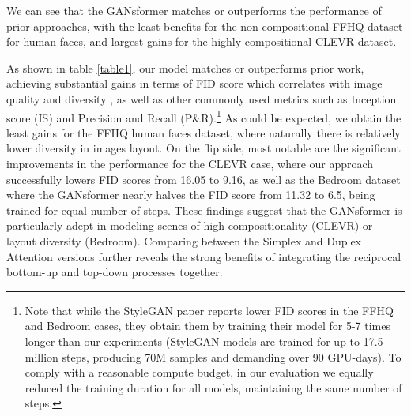\documentclass{article}
\begin{document}
\begin{figure*}[t]
\centering
{}
\hfill
{}
\hfill
{}
\vspace*{-2mm}
\caption{From left to right: \textbf{(1-2)} Performance as a function of start and final layers the attention is applied to. \textbf{(3)}: data-efficiency experiments for CLEVR.}
\label{plots}
\vspace*{-12pt}
\end{figure*}

We can see that the GANsformer matches or outperforms the performance of prior approaches, with the least benefits for the non-compositional FFHQ dataset for human faces, and largest gains for the highly-compositional CLEVR dataset. 

As shown in table \ref{table1}, our model matches or outperforms prior work, achieving substantial gains in terms of FID score which correlates with image quality and diversity \citep{fid}, as well as other commonly used metrics such as Inception score (IS) and Precision and Recall (P{\&}R).\footnote{Note that while the StyleGAN paper \citep{stylegan2} reports lower FID scores in the FFHQ and Bedroom cases, they obtain them by training their model for 5-7 times longer than our experiments (StyleGAN models are trained for up to 17.5 million steps, producing 70M samples and demanding over 90 GPU-days). To comply with a reasonable compute budget, in our evaluation we equally reduced the training duration for all models, maintaining the same number of steps.} As could be expected, we obtain the least gains for the FFHQ human faces dataset, where naturally there is relatively lower diversity in images layout. On the flip side, most notable are the significant improvements in the performance for the CLEVR case, where our approach successfully lowers FID scores from 16.05 to 9.16, as well as the Bedroom dataset where the GANsformer nearly halves the FID score from 11.32 to 6.5, being trained for equal number of steps. These findings suggest that the GANsformer is particularly adept in modeling scenes of high compositionality (CLEVR) or layout diversity (Bedroom). Comparing between the Simplex and Duplex Attention versions further reveals the strong benefits of integrating the reciprocal bottom-up and top-down processes together.
\end{document}
